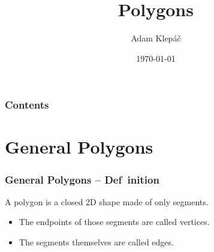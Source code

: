 \documentclass[aspectratio=169,11pt,svgnames]{beamer}
\title{Polygons}
\date{\today}
\author{Adam Klepáč}
\institute[GEVO]{Gymnázium Evolution Jižní Město}
\begin{document}
\titleframe

\begin{frame}
 \frametitle{Contents}
 \tableofcontents
\end{frame}

\section{General Polygons}
\label{sec:general-polygons}

\begin{frame}
 \frametitle{General Polygons -- Def~\hspace{-.4ex}inition}
 \begin{tcolorbox}[title=Polygon]
  A \alert{polygon} is a closed 2D shape made of only segments.
 \end{tcolorbox}
 \begin{itemize}
  \item<2-> The endpoints of those segments are called \alert{vertices}.
  \item<3-> The segments themselves are called \alert{edges}.
 \end{itemize}
\end{frame}
\end{document}
